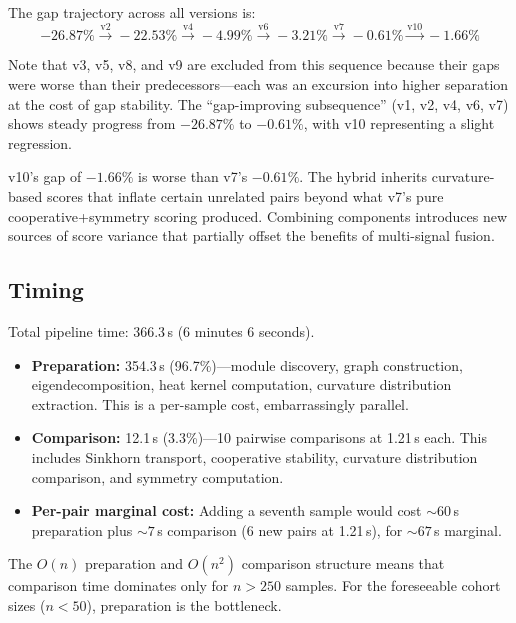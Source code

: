 \documentclass{../yalumba}
\begin{document}
The gap trajectory across all versions is:
\[
-26.87\% \xrightarrow{\text{v2}} -22.53\% \xrightarrow{\text{v4}} -4.99\%
\xrightarrow{\text{v6}} -3.21\% \xrightarrow{\text{v7}} -0.61\%
\xrightarrow{\text{v10}} -1.66\%
\]


Note that v3, v5, v8, and v9 are excluded from this sequence because
their gaps were worse than their predecessors---each was an excursion
into higher separation at the cost of gap stability.  The ``gap-improving
subsequence'' (v1, v2, v4, v6, v7) shows steady progress from $-26.87\%$
to $-0.61\%$, with v10 representing a slight regression.

\begin{limitation}
v10's gap of $-1.66\%$ is worse than v7's $-0.61\%$.  The hybrid
inherits curvature-based scores that inflate certain unrelated pairs
beyond what v7's pure cooperative+symmetry scoring produced.  Combining
components introduces new sources of score variance that partially
offset the benefits of multi-signal fusion.
\end{limitation}

\subsection{Timing}

Total pipeline time: 366.3\,s (6 minutes 6 seconds).

\begin{itemize}
\item \textbf{Preparation:} 354.3\,s (96.7\%)---module discovery, graph
  construction, eigendecomposition, heat kernel computation, curvature
  distribution extraction.  This is a per-sample cost, embarrassingly
  parallel.
\item \textbf{Comparison:} 12.1\,s (3.3\%)---10 pairwise comparisons at
  1.21\,s each.  This includes Sinkhorn transport, cooperative stability,
  curvature distribution comparison, and symmetry computation.
\item \textbf{Per-pair marginal cost:} Adding a seventh sample would cost
  ${\sim}60$\,s preparation plus ${\sim}7$\,s comparison (6 new pairs at
  1.21\,s), for ${\sim}67$\,s marginal.
\end{itemize}

The $O(n)$ preparation and $O(n^2)$ comparison structure means that
comparison time dominates only for $n > 250$ samples.  For the
foreseeable cohort sizes ($n < 50$), preparation is the bottleneck.
\end{document}
